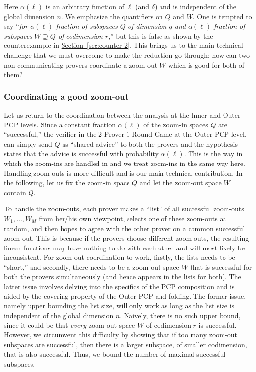 \documentclass[11pt]{article}
\numberwithin{equation}{section}
\theoremstyle{definition}
\theoremstyle{plain}
\newcommand{\expref}[2]{\hyperref[#2]{#1~\ref{#2}}}
\begin{document}
\medskip
Here $\alpha(\ell)$ is an arbitrary function of $\ell$ (and $\delta$) and is independent of the global dimension $n$.
We emphasize the quantifiers on $Q$ and $W$. One is tempted to say ``{\it for $\alpha(\ell)$ fraction of subspaces $Q$ of dimension $q$ and $\alpha(\ell)$
fraction of subspaces $W \supseteq Q$ of codimension $r$},'' but this is false as shown by the counterexample in \expref{Section}{sec:counter-2}.
This brings us to the main technical challenge that we must overcome to make the reduction go through: how can two non-communicating provers coordinate a zoom-out $W$ which is good for both of them?

\subsubsection{Coordinating a good zoom-out}\label{sec:coordinate_zoom_out}
 Let us return to the coordination between
 the analysis at the Inner and Outer PCP levels.
Since a constant fraction $\alpha(\ell)$ of the zoom-in spaces $Q$ are ``successful,'' the
verifier in the 2-Prover-1-Round Game at the Outer PCP level, can simply send $Q$ as ``shared advice'' to both the provers and the hypothesis states that the advice is successful with probability
$\alpha(\ell)$. This is the way in which the zoom-ins are handled in \cite{KMS}
and we treat zoom-ins in the same way here. %
Handling zoom-outs is more difficult and is
our main technical contribution. In the following,
let us fix the zoom-in space $Q$ and let the zoom-out space $W$ contain $Q$.

\smallskip To handle the zoom-outs, each prover makes a ``list'' of all
successful zoom-outs $W_1, \ldots, W_M$ from her/his own viewpoint,
selects one of these zoom-outs at random, and then hopes to agree with
the other prover on a common successful zoom-out. This is because if the provers choose
different zoom-outs, the resulting linear functions may have nothing to do with
each other and will most likely be inconsistent. For zoom-out coordination to work,
firstly, the lists needs to be ``short,'' and secondly, there needs to
be a zoom-out space $W$ that is successful for both the provers
simultaneously (and hence appears in the lists for both). The latter
issue involves delving into the specifics of the PCP composition and
is aided by the covering property of the Outer PCP and folding.
The former issue, namely upper bounding
the list size, will only work as long as the list size is independent
of the global dimension $n$.  Naively, there is no such upper bound,
since it could be that {\it every} zoom-out space $W$ of codimension %
$r$ is successful. However, we circumvent this difficulty by showing
that if too many zoom-out subspaces are successful, then there is a
larger subspace, of smaller codimension, that is also
successful. Thus, we bound the number of maximal successful subspaces.
\end{document}

